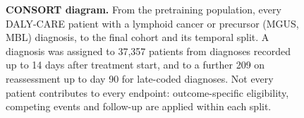 \documentclass[11pt]{article}
\newcommand{\indextableref}{table of prognostic indices}
\begin{document}
\renewcommand{\cref}[1]{\indextableref}

\clearpage
\begin{figure}[p]
\centering
\resizebox{!}{0.84\textheight}{}
\caption{\textbf{CONSORT diagram.} From the pretraining population, every DALY-CARE
patient with a lymphoid cancer or precursor (MGUS, MBL) diagnosis, to the final cohort and its temporal
split. A diagnosis was assigned to 37,357 patients from diagnoses recorded up to
14 days after treatment start, and to a further 209 on reassessment up to day 90
for late-coded diagnoses. Not every patient contributes to
every endpoint: outcome-specific eligibility, competing events and follow-up are
applied within each split.}
\label{fig:consort}
\end{figure}
\end{document}
